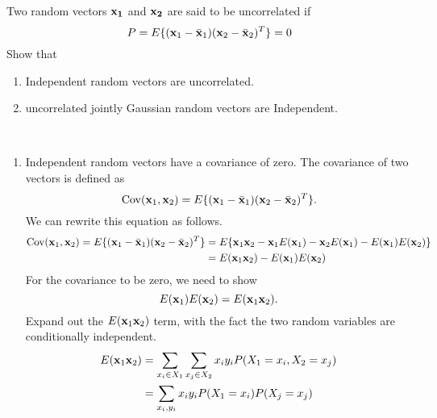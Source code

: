 \documentclass{article}
\begin{document}
    \bigbreak
    \begin{problem}
        Two random vectors $\vb{x_1}$ and $\vb{x_2}$ are said to be uncorrelated if
        \begin{equation}
            P = E \{ (\vb{x}_1 - \bar{\vb{x}}_1) (\vb{x}_2 - \bar{\vb{x}}_2)^T \} = 0
        \end{equation}
        Show that
        \begin{enumerate}[label=(\alph*)]
            \item Independent random vectors are uncorrelated.
            \item uncorrelated jointly Gaussian random vectors are Independent.
        \end{enumerate}
    \end{problem}

    \begin{solution}
        ~%
        \begin{enumerate}[label=(\alph*)]
            \item Independent random vectors have a covariance of zero. The covariance of two vectors is defined as 
            \begin{equation*}
                \operatorname{Cov}(\vb{x}_1, \vb{x}_2) = E \{ (\vb{x}_1 - \bar{\vb{x}}_1) (\vb{x}_2 - \bar{\vb{x}}_2)^T \}.
            \end{equation*}
            We can rewrite this equation as follows.
            \begin{align*}
                \operatorname{Cov}(\vb{x}_1, \vb{x}_2) = E \{ (\vb{x}_1 - \bar{\vb{x}}_1) (\vb{x}_2 - \bar{\vb{x}}_2)^T \} &=
                E \{ \vb{x}_1 \vb{x}_2  - \vb{x}_1 E(\vb{x}_1) - \vb{x}_2 E(\vb{x}_1) - E(\vb{x}_1)E(\vb{x}_2) \} \\
                &= E(\vb{x}_1 \vb{x}_2) - E(\vb{x}_1)E(\vb{x}_2)
            \end{align*}
            For the covariance to be zero, we need to show
            \begin{equation*}
                 E(\vb{x}_1)E(\vb{x}_2) = E(\vb{x}_1 \vb{x}_2).
            \end{equation*}
            Expand out the $E(\vb{x}_1 \vb{x}_2)$ term, with the fact the two random variables are conditionally independent.
            \begin{align*}
                E(\vb{x}_1 \vb{x}_2) &= \sum_{x_i \in X_1} \sum_{x_j \in X_2} x_i y_i P(X_1 = x_i, X_2 = x_j) \\
                &= \sum_{x_i, y_i} x_i y_i P(X_1 = x_i)P(X_j = x_j) \\

\end{align*}
\end{enumerate}
\end{solution}
\end{document}
